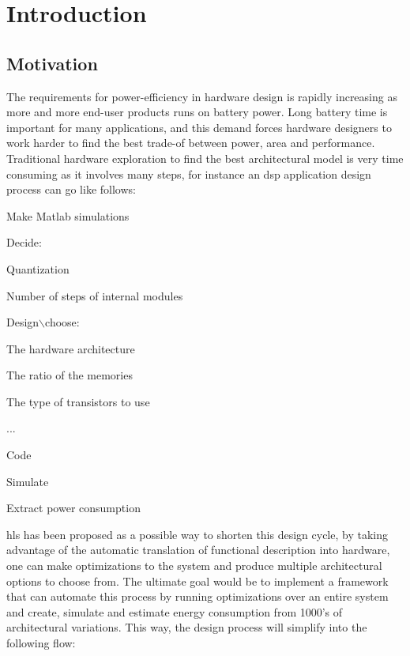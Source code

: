 \chapter{Introduction}
\label{chp:introduction} 
\section{\label{sec:motivation}Motivation}
The requirements for power-efficiency in hardware design is rapidly increasing as more and more end-user products runs on battery power. Long battery time is important for many applications, and this demand forces hardware designers to work harder to find the best trade-of between power, area and performance. Traditional hardware exploration to find the best architectural model is very time consuming as it involves many steps, for instance an \gls{dsp} application design process can go like follows:
\begin{compactenum}
    \item Make Matlab simulations 
    \item Decide:
    \begin{compactitem}
        \item Quantization
        \item Number of steps of internal modules
    \end{compactitem}
    \item Design$\backslash$choose:
    \begin{compactitem}
        \item The hardware architecture
        \item The ratio of the memories
        \item The type of transistors to use
    \end{compactitem}
    \item ...
    \item Code
    \item Simulate
    \item Extract power consumption
\end{compactenum}
\gls{hls} has been proposed as a possible way to shorten this design cycle, by taking advantage of the automatic translation of functional description into hardware, one can make optimizations to the system and produce multiple architectural options to choose from. The ultimate goal would be to implement a framework that can automate this process by running optimizations over an entire system and create, simulate and estimate energy consumption from 1000’s of architectural variations. This way, the design process will simplify into the following flow:
